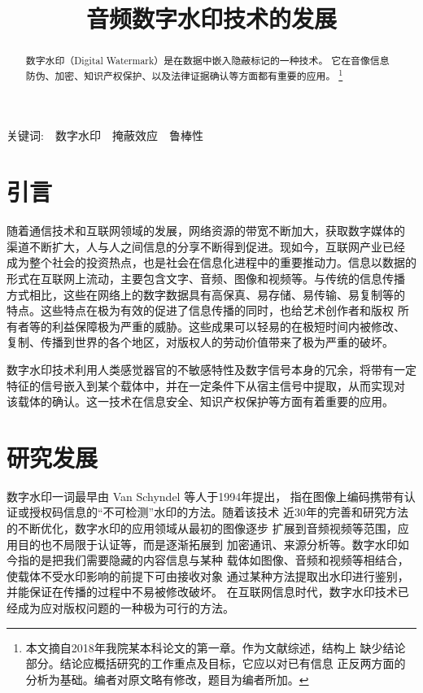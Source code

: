 \documentclass[a4paper]{article}
\title{音频数字水印技术的发展}
\begin{document}
\maketitle

\begin{abstract}
    数字水印（Digital Watermark）是在数据中嵌入隐蔽标记的一种技术。
它在音像信息防伪、加密、知识产权保护、以及法律证据确认等方面都有重要的应用。
\footnote{本文摘自2018年我院某本科论文的第一章。作为文献综述，结构上
缺少结论部分。结论应概括研究的工作重点及目标，它应以对已有信息
    正反两方面的分析为基础。编者对原文略有修改，题目为编者所加。}

\end{abstract}

关键词:~~数字水印~~掩蔽效应~~鲁棒性

\section{引言}
随着通信技术和互联网领域的发展，网络资源的带宽不断加大，获取数字媒体的
渠道不断扩大，人与人之间信息的分享不断得到促进。现如今，互联网产业已经
成为整个社会的投资热点，也是社会在信息化进程中的重要推动力。信息以数据的
形式在互联网上流动，主要包含文字、音频、图像和视频等。与传统的信息传播
方式相比，这些在网络上的数字数据具有高保真、易存储、易传输、易复制等的
特点。这些特点在极为有效的促进了信息传播的同时，也给艺术创作者和版权
所有者等的利益保障极为严重的威胁。这些成果可以轻易的在极短时间内被修改、
复制、传播到世界的各个地区，对版权人的劳动价值带来了极为严重的破坏。

数字水印技术利用人类感觉器官的不敏感特性及数字信号本身的冗余，将带有一定
特征的信号嵌入到某个载体中，并在一定条件下从宿主信号中提取，从而实现对
该载体的确认。这一技术在信息安全、知识产权保护等方面有着重要的应用。

\section{研究发展}
数字水印一词最早由 Van Schyndel 等人\cite{schyndel1994}于1994年提出，
指在图像上编码携带有认证或授权码信息的“不可检测”水印的方法。随着该技术
近30年的完善和研究方法的不断优化，数字水印的应用领域从最初的图像逐步
扩展到音频视频等范围，应用目的也不局限于认证等，而是逐渐拓展到
加密通讯、来源分析等。数字水印如今指的是把我们需要隐藏的内容信息与某种
载体如图像、音频和视频等相结合，使载体不受水印影响的前提下可由接收对象
通过某种方法提取出水印进行鉴别，并能保证在传播的过程中不易被修改破坏。
在互联网信息时代，数字水印技术已经成为应对版权问题的一种极为可行的方法。
\end{document}
